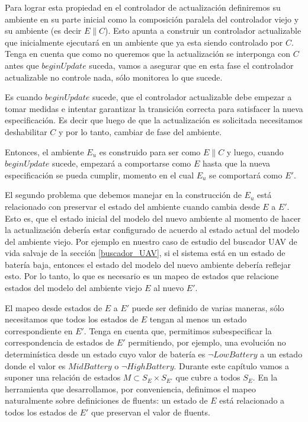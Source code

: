 Para lograr esta propiedad en el controlador de actualización definiremos su ambiente en su parte inicial como la
composición paralela del controlador viejo y su ambiente (es decir $E\|C$). Esto apunta a construir un controlador
actualizable que inicialmente ejecutará en un ambiente que ya esta siendo controlado por $C$. Tenga en cuenta que como
no queremos que la actualización se interponga con $C$ antes que $beginUpdate$ suceda, vamos a asegurar que en esta fase
el controlador actualizable no controle nada, sólo monitorea lo que sucede.

Es cuando $beginUpdate$ sucede, que el controlador actualizable debe empezar a tomar medidas e intentar garantizar
la transición correcta para satisfacer la nueva especificación. Es decir que luego de que la actualización es
solicitada necesitamos deshabilitar $C$ y por lo tanto, cambiar de fase del ambiente.

Entonces, el ambiente $E_u$ es construido para ser como $E\|C$ y luego, cuando $beginUpdate$ sucede, empezará a
comportarse como $E$ hasta que la nueva especificación se pueda cumplir, momento en el cual $E_u$ se comportará como
$E'$.

El segundo problema que debemos manejar en la construcción de $E_u$ está relacionado con preservar el estado
del ambiente cuando cambia desde $E$ a $E'$. Esto es, que el estado inicial del modelo del nuevo ambiente al
momento de hacer la actualización debería estar configurado de acuerdo al estado actual del modelo del ambiente viejo.
Por ejemplo en nuestro caso de estudio del buscador UAV de vida salvaje de la sección \ref{buscador_UAV}, si el sistema
está en un estado de batería baja, entonces el estado del modelo del nuevo ambiente debería reflejar esto. Por lo tanto,
lo que es necesario es un mapeo de estados que relacione estados del modelo del ambiente viejo $E$ al nuevo $E'$.

El mapeo desde estados de $E$ a $E'$ puede ser definido de varias maneras, sólo necesitamos que todos los estados de $E$
tengan al menos un estado correspondiente en $E'$. Tenga en cuenta que, permitimos subespecificar la correspondencia de
estados de $E'$ permitiendo, por ejemplo, una evolución no determinística desde un estado cuyo valor de batería es
$\lnot LowBattery$ a un estado donde el valor es $MidBattery$ o $\neg HighBattery$. Durante este capítulo vamos a suponer
una relación de estados $M \subset S_E \times S_{E'}$ que cubre a todos $S_E$. En la herramienta que
desarrollamos, por conveniencia, definimos el mapeo naturalmente sobre definiciones de fluents: un estado de $E$ está
relacionado a todos los estados de $E'$ que preservan el valor de fluents.


